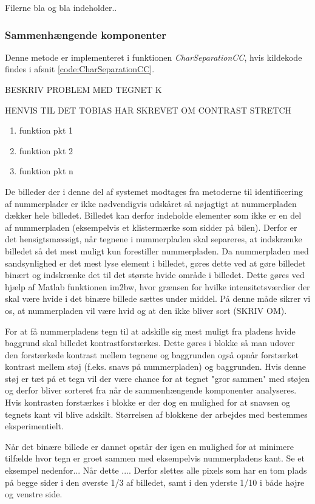 Filerne bla og bla indeholder..

\subsubsection*{Sammenhængende komponenter}

Denne metode er implementeret i funktionen \textit{CharSeparationCC}, hvis kildekode findes i afsnit \vref{code:CharSeparationCC}.

BESKRIV PROBLEM MED TEGNET K

HENVIS TIL DET TOBIAS HAR SKREVET OM CONTRAST STRETCH

\begin{enumerate}
\item funktion pkt 1
\item funktion pkt 2
\item funktion pkt n
\end{enumerate}

De billeder der i denne del af systemet modtages fra metoderne til identificering af nummerplader er ikke nødvendigvis udskåret så nøjagtigt at nummerpladen dækker hele billedet. Billedet kan derfor indeholde elementer som ikke er en del af nummerpladen (eksempelvis et klistermærke som sidder på bilen). Derfor er det hensigtsmæssigt, når tegnene i nummerpladen skal separeres, at indskrænke billedet så det mest muligt kun forestiller nummerpladen. Da nummerpladen med sandsynlighed er det mest lyse element i billedet, gøres dette ved at gøre billedet binært og indskrænke det til det største hvide område i billedet. Dette gøres ved hjælp af Matlab funktionen im2bw, hvor grænsen for hvilke intensitetsværdier der skal være hvide i det binære billede sættes under middel. På denne måde sikrer vi os, at nummerpladen vil være hvid og at den ikke bliver sort (SKRIV OM).

For at få nummerpladens tegn til at adskille sig mest muligt fra pladens hvide baggrund skal billedet kontrastforstærkes. Dette gøres i blokke så man udover den forstærkede kontrast mellem tegnene og baggrunden også opnår forstærket kontrast mellem støj (f.eks. snavs på nummerpladen) og baggrunden. Hvis denne støj er tæt på et tegn vil der være chance for at tegnet "gror sammen" med støjen og derfor bliver sorteret fra når de sammenhængende komponenter analyseres. Hvis kontrasten forstærkes i blokke er der dog en mulighed for at snavsen og tegnets kant vil blive adskilt. Størrelsen af blokkene der arbejdes med bestemmes eksperimentielt.

Når det binære billede er dannet opstår der igen en mulighed for at minimere tilfælde hvor tegn er groet sammen med eksempelvis nummerpladens kant. Se et eksempel nedenfor... Når dette .... Derfor slettes alle pixels som har en tom plads på begge sider i den øverste 1/3 af billedet, samt i den yderste 1/10 i både højre og venstre side.

